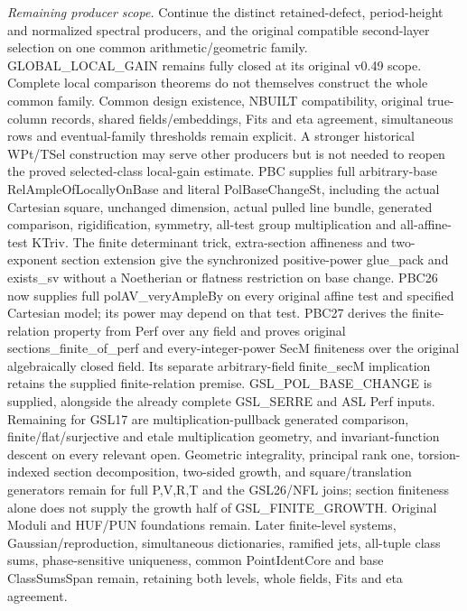 \documentclass[11pt,a4paper]{article}
\numberwithin{equation}{section}
\theoremstyle{remark}\newtheorem{remark}[theorem]{Remark}
\begin{document}
\emph{Remaining producer scope.} Continue the distinct retained-defect, period-height and normalized spectral producers, and the original compatible second-layer selection on one common arithmetic/geometric family. GLOBAL\_\allowbreak LOCAL\_\allowbreak GAIN remains fully closed at its original v0.49 scope. Complete local comparison theorems do not themselves construct the whole common family. Common design existence, NBUILT compatibility, original true-column records, shared fields/embeddings, Fits and eta agreement, simultaneous rows and eventual-family thresholds remain explicit. A stronger historical WPt/TSel construction may serve other producers but is not needed to reopen the proved selected-class local-gain estimate. PBC supplies full arbitrary-base RelAmpleOfLocallyOnBase and literal PolBaseChangeSt, including the actual Cartesian square, unchanged dimension, actual pulled line bundle, generated comparison, rigidification, symmetry, all-test group multiplication and all-affine-test KTriv. The finite determinant trick, extra-section affineness and two-exponent section extension give the synchronized positive-power glue\_\allowbreak pack and exists\_\allowbreak sv without a Noetherian or flatness restriction on base change. PBC26 now supplies full polAV\_\allowbreak veryAmpleBy on every original affine test and specified Cartesian model; its power may depend on that test. PBC27 derives the finite-relation property from Perf over any field and proves original sections\_\allowbreak finite\_\allowbreak of\_\allowbreak perf and every-integer-power SecM finiteness over the original algebraically closed field. Its separate arbitrary-field finite\_\allowbreak secM implication retains the supplied finite-relation premise. GSL\_\allowbreak POL\_\allowbreak BASE\_\allowbreak CHANGE is supplied, alongside the already complete GSL\_\allowbreak SERRE and ASL Perf inputs. Remaining for GSL17 are multiplication-pullback generated comparison, finite/flat/surjective and etale multiplication geometry, and invariant-function descent on every relevant open. Geometric integrality, principal rank one, torsion-indexed section decomposition, two-sided growth, and square/translation generators remain for full P,V,R,T and the GSL26/NFL joins; section finiteness alone does not supply the growth half of GSL\_\allowbreak FINITE\_\allowbreak GROWTH. Original Moduli and HUF/PUN foundations remain. Later finite-level systems, Gaussian/reproduction, simultaneous dictionaries, ramified jets, all-tuple class sums, phase-sensitive uniqueness, common PointIdentCore and base ClassSumsSpan remain, retaining both levels, whole fields, Fits and eta agreement.
\end{document}
